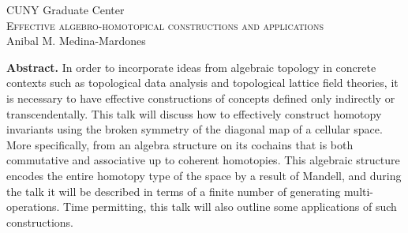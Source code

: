 \documentclass{article}
\begin{document}
	\pagestyle{empty}
	\begin{center}
		\large CUNY Graduate Center \\
		\vspace*{5pt}
		\Large\textsc{Effective algebro-homotopical constructions and applications} \\
		\vspace*{10pt}
		\normalsize Anibal M. Medina-Mardones \\
	\end{center}
	\textbf{Abstract.} In order to incorporate ideas from algebraic topology in concrete contexts such as topological data analysis and topological lattice field theories, it is necessary to have effective constructions of concepts defined only indirectly or transcendentally.
	This talk will discuss how to effectively construct homotopy invariants using the broken symmetry of the diagonal map of a cellular space.
	More specifically, from an algebra structure on its cochains that is both commutative and associative up to coherent homotopies.
	This algebraic structure encodes the entire homotopy type of the space by a result of Mandell, and during the talk it will be described in terms of a finite number of generating multi-operations.
	Time permitting, this talk will also outline some applications of such constructions.
\end{document}
